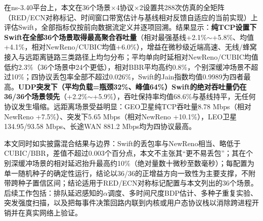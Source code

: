 \documentclass[10pt,twocolumn]{article}
\begin{document}
在ns-3.40平台上，本文在36个场景$\times$4协议$\times$2设置共288次仿真的全矩阵（RED/ECN对称标记、时间窗口带宽估计与基线相对反馈自适应的当前实现）上评估Swift，全部指标仅按前向数据流定义并逐项回溯。结果显示：\textbf{纯TCP设置下Swift在全部36个场景取得最高聚合吞吐量}（相对最强基线+2.1\%$\sim$+5.8\%、均值+4.1\%，相对NewReno/CUBIC均值+6.0\%），增益在微秒级近端高速、无线/蜂窝接入与远距离链路三类路径上均匀分布；平均单向时延相对NewReno/CUBIC均值低约2.3\%（36个场景中24个更低），相对BBR平均高约0.8\%，个别深缓冲场景不超过10\%；四协议丢包率全部不超过0.026\%，Swift的Jain指数均值0.9989为四者最高。\textbf{UDP突发下（平均负载=瓶颈32\%、峰值64\%）Swift的绝对吞吐量仍在36/36个场景领先}（+2.2\%$\sim$+5.9\%），吞吐保持率均值68.6\%与基线持平，无任何协议发生塌缩。远距离场景受益明显：GEO卫星纯TCP吞吐量8.78 Mbps（相对NewReno +7.5\%）、突发下5.65 Mbps（相对NewReno +10.1\%），LEO卫星134.95/93.58 Mbps、长途WAN 881.2 Mbps均为四协议最高。

本文同时如实披露混合结果与边界：Swift的丢包率与NewReno相当、略低于CUBIC/BBR，差值不超过0.003个百分点，本文不主张其“更不易丢包”；其在个别深缓冲场景的相对延迟抬升最高约10\%（绝对量数十微秒至数毫秒）；每配置为单一随机种子的确定性运行，结论以36/36的正增益方向一致性为主要支撑，不附带跨种子置信区间；结论适用于RED/ECN对称标记配置与本文列出的36个场景。后续工作包括：排队延迟感知的$\alpha$调度、多时间尺度BDP估计、多种子重复实验、突发强度扫描，以及把每事件决策回路内联到内核或用户态协议栈以消除跨进程开销并在真实网络上验证。
\end{document}

